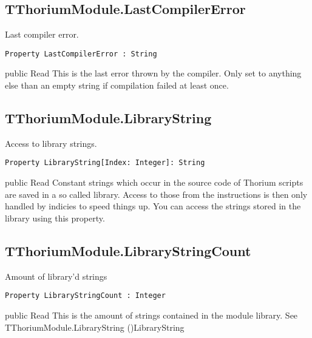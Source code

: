 \subsection{TThoriumModule.LastCompilerError}
\label{thoriumcorepkg:thorium:tthoriummodule:lastcompilererror}
\begin{FPCList}
\Synopsis
Last compiler error.\Declaration 

\begin{verbatim}
Property LastCompilerError : String
\end{verbatim}
\Visibility
public
\Access
Read
\Description
This is the last error thrown by the compiler. Only set to anything else than an empty string if compilation failed at least once.\end{FPCList}
\subsection{TThoriumModule.LibraryString}
\label{thoriumcorepkg:thorium:tthoriummodule:librarystring}
\begin{FPCList}
\Synopsis
Access to library strings.\Declaration 

\begin{verbatim}
Property LibraryString[Index: Integer]: String
\end{verbatim}
\Visibility
public
\Access
Read
\Description
Constant strings which occur in the source code of Thorium scripts are saved in a so called library. Access to those from the instructions is then only handled by indicies to speed things up. You can access the strings stored in the library using this property.\end{FPCList}
\subsection{TThoriumModule.LibraryStringCount}
\label{thoriumcorepkg:thorium:tthoriummodule:librarystringcount}
\begin{FPCList}
\Synopsis
Amount of library'd strings\Declaration 

\begin{verbatim}
Property LibraryStringCount : Integer
\end{verbatim}
\Visibility
public
\Access
Read
\Description
This is the amount of strings contained in the module library. See TThoriumModule.LibraryString (\pageref{thoriumcorepkg:thorium:tthoriummodule:librarystring})LibraryString\end{FPCList}
